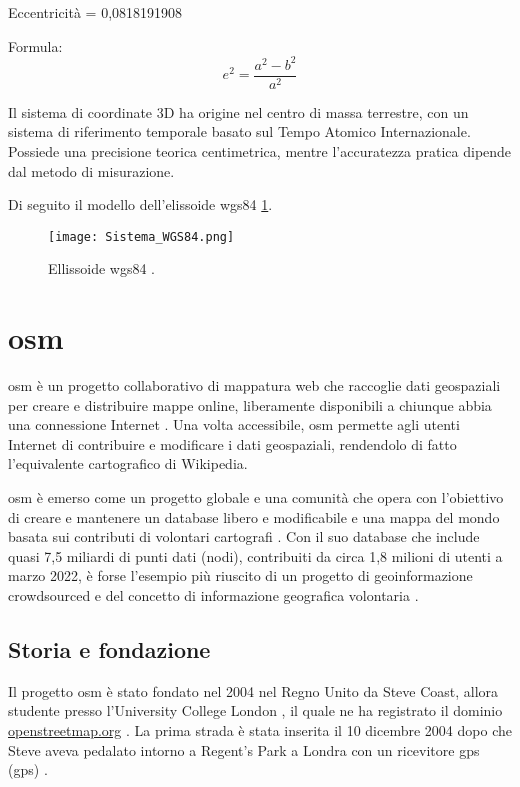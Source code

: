 Eccentricità = 0,0818191908

Formula:
\begin{equation}
  e^2 = \frac{a^2 - b^2}{a^2}
\end{equation}

Il sistema di coordinate 3D ha origine nel centro di massa terrestre, con un sistema di riferimento temporale
basato sul Tempo Atomico Internazionale. Possiede una precisione teorica centimetrica, mentre l'accuratezza pratica
dipende dal metodo di misurazione.

Di seguito il modello dell'elissoide \acrshort{wgs84} \ref{fig:elissoide-wgs84}.

\begin{figure}[H]
  \centering
  \texttt{[image: Sistema\_WGS84.png]}
  \caption{Ellissoide \acrshort{wgs84} \cite{topgeometri}.}
  \label{fig:elissoide-wgs84}
\end{figure}

\section{\acrlong{osm}}

\acrfull{osm} è un progetto collaborativo di mappatura web che raccoglie dati geospaziali per creare e
distribuire mappe online, liberamente disponibili a chiunque abbia una connessione Internet \cite{neis2012}.
Una volta accessibile, \acrfull{osm} permette agli utenti Internet di contribuire e modificare i dati geospaziali,
rendendolo di fatto l'equivalente cartografico di Wikipedia.

\acrfull{osm} è emerso come un progetto globale e una comunità che opera con l'obiettivo di creare e mantenere
un database libero e modificabile e una mappa del mondo basata sui contributi di volontari cartografi \cite{fonte2022}.
Con il suo database che include quasi 7,5 miliardi di punti dati (nodi), contribuiti da circa 1,8 milioni di utenti
a marzo 2022, è forse l'esempio più riuscito di un progetto di geoinformazione crowdsourced e
del concetto di informazione geografica volontaria \cite{fonte2022}.

\subsection{Storia e fondazione}

Il progetto \acrfull{osm} è stato fondato nel 2004 nel Regno Unito da Steve Coast, allora studente presso
l'University College London \cite{osmhistory2024}, il quale ne ha registrato il dominio
\href{openstreetmap.org}{openstreetmap.org} \cite{osmhistory2024}.
La prima strada è stata inserita il 10 dicembre 2004 dopo che Steve aveva pedalato intorno a Regent's Park a Londra
con un ricevitore \acrshort{gps} (\acrlong{gps}) \cite{coast2004}.

